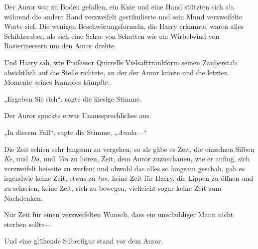 Der Auror war zu Boden gefallen, ein Knie und eine Hand stützten sich ab, während die andere Hand verzweifelt gestikulierte und sein Mund verzweifelte Worte rief. Die wenigen Beschwörungsformeln, die Harry erkannte, waren alles Schildzauber, als sich eine Schar von Schatten wie ein Wirbelwind von Rasiermessern um den Auror drehte.

Und Harry sah, wie Professor Quirrells Vielsafttrankform seinen Zauberstab absichtlich auf die Stelle richtete, an der der Auror kniete und die letzten Momente seines Kampfes kämpfte.

„Ergeben Sie sich“, sagte die kiesige Stimme.

Der Auror spuckte etwas Unaussprechliches aus.

„In diesem Fall“, sagte die Stimme, „\emph{Avada}—“

Die Zeit schien sehr langsam zu vergehen, so als gäbe es Zeit, die einzelnen Silben \emph{Ke}, und \emph{Da}, und \emph{Vra} zu hören, Zeit, dem Auror zuzuschauen, wie er anfing, sich verzweifelt beiseite zu werfen; und obwohl das alles so langsam geschah, gab es irgendwie keine Zeit, etwas zu \emph{tun}, keine Zeit für Harry, die Lippen zu öffnen und  zu schreien, keine Zeit, sich zu bewegen, vielleicht sogar keine Zeit zum Nachdenken.

Nur Zeit für einen verzweifelten Wunsch, dass ein unschuldiger Mann nicht sterben sollte—

Und eine glühende Silberfigur stand vor dem Auror.


